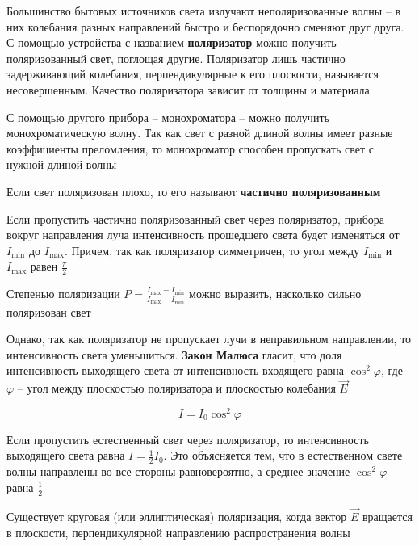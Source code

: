 Большинство бытовых источников света излучают неполяризованные волны -- в них колебания разных направлений быстро и беспорядочно сменяют друг друга. С помощью устройства с названием \textbf{поляризатор} можно получить поляризованный свет, поглощая другие. Поляризатор лишь частично задерживающий колебания, перпендикулярные к его плоскости, называется несовершенным. Качество поляризатора зависит от толщины и материала

С помощью другого прибора -- монохроматора -- можно получить монохроматическую волну. Так как свет с разной длиной волны имеет разные коэффициенты преломления, то монохроматор способен пропускать свет с нужной длиной волны

Если свет поляризован плохо, то его называют \textbf{частично поляризованным}


Если пропустить частично поляризованный свет через поляризатор, прибора вокруг направления луча интенсивность прошедшего света будет изменяться от $I_\min$ до $I_\max$. Причем, так как поляризатор симметричен, то угол между $I_\min$ и $I_\max$ равен $\frac{\pi}{2}$

Степенью поляризации $P = \frac{I_{\max} - I_\min}{I_{\max} + I_\min}$ можно выразить, насколько сильно поляризован свет 

\mediumvspace

Однако, так как поляризатор не пропускает лучи в неправильном направлении, то интенсивность света уменьшиться. \textbf{Закон Малюса} гласит, что доля интенсивность выходящего света от интенсивность входящего равна $\cos^2 \varphi$, где $\varphi$ -- угол между плоскостью поляризатора и плоскостью колебания $\vec E$

\[I = I_0 \cos^2 \varphi\]

Если пропустить естественный свет через поляризатор, то интенсивность выходящего света равна $I = \frac{1}{2} I_0$. Это объясняется тем, что в естественном свете волны направлены во все стороны равновероятно, а среднее значение $\cos^2 \varphi$ равна $\frac{1}{2}$

\mediumvspace

Существует круговая (или эллиптическая) поляризация, когда вектор $\vec E$ вращается в плоскости, перпендикулярной направлению распространения волны

